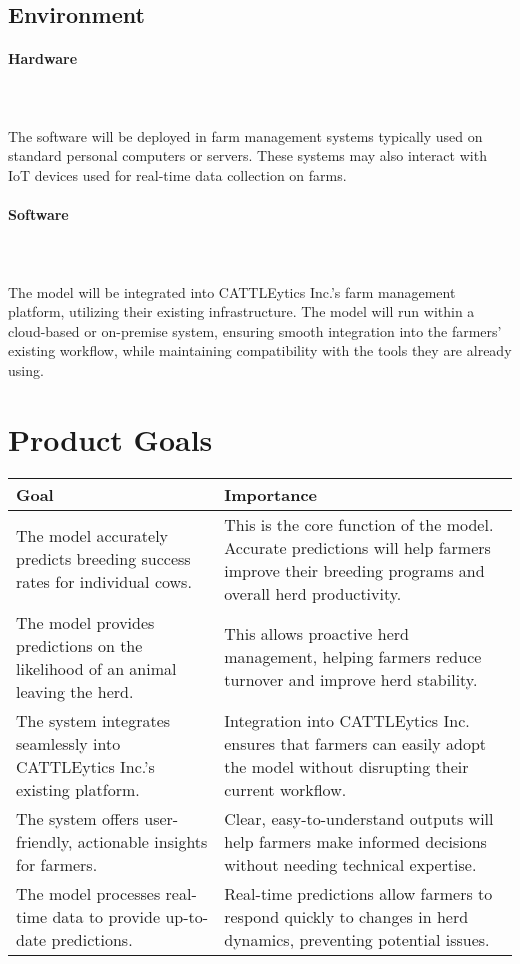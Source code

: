 \documentclass{article}
\begin{document}
\subsection{Environment}

\paragraph{Hardware} \ \\
\\
The software will be deployed in farm management systems typically used on standard personal computers or servers. These systems may also interact with IoT devices used for real-time data collection on farms.
\paragraph{Software} \ \\
\\
The model will be integrated into CATTLEytics Inc.'s farm management platform, utilizing their existing infrastructure. The model will run within a cloud-based or on-premise system, ensuring smooth integration into the farmers' existing workflow, while maintaining compatibility with the tools they are already using.



\section{Product Goals}

\begin{table}[H]
\centering
\begin{tabularx}{\textwidth}{|p{}|p{}|} %
\hline
\textbf{Goal} & \textbf{Importance} \\ \hline
The model accurately predicts breeding success rates for individual cows. & This is the core function of the model. Accurate predictions will help farmers improve their breeding programs and overall herd productivity. \\ \hline
The model provides predictions on the likelihood of an animal leaving the herd. & This allows proactive herd management, helping farmers reduce turnover and improve herd stability. \\ \hline
The system integrates seamlessly into CATTLEytics Inc.'s existing platform. & Integration into CATTLEytics Inc. ensures that farmers can easily adopt the model without disrupting their current workflow. \\ \hline
The system offers user-friendly, actionable insights for farmers. & Clear, easy-to-understand outputs will help farmers make informed decisions without needing technical expertise. \\ \hline
The model processes real-time data to provide up-to-date predictions. & Real-time predictions allow farmers to respond quickly to changes in herd dynamics, preventing potential issues. \\ \hline
\end{tabularx}
\end{table}
\end{document}

